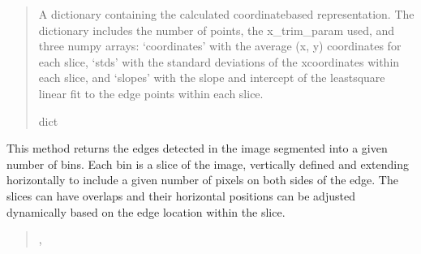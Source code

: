 \documentclass[letterpaper,10pt,english]{sphinxmanual}
\begin{document}
\begin{fulllineitems}
\begin{fulllineitems}
\begin{quote}
\begin{description}
\begin{itemize}
\end{itemize}

\sphinxAtStartPar
A dictionary containing the calculated coordinate\sphinxhyphen{}based representation. The dictionary
includes the number of points, the x\_trim\_param used, and three numpy arrays: ‘coordinates’
with the average (x, y) coordinates for each slice, ‘stds’ with the standard deviations
of the x\sphinxhyphen{}coordinates within each slice, and ‘slopes’ with the slope and intercept of
the least\sphinxhyphen{}square linear fit to the edge points within each slice.

\sphinxAtStartPar
dict

\end{description}\end{quote}

\end{fulllineitems}


\begin{fulllineitems}
\label{\detokenize{forensicfit.core.tape:forensicfit.core.tape.TapeAnalyzer.get_bin_based}}
\pysigstartsignatures
{}
\pysigstopsignatures
\sphinxAtStartPar
This method returns the edges detected in the image segmented into a given number of bins. Each bin is a slice
of the image, vertically defined and extending horizontally to include a given number of pixels on both sides
of the edge. The slices can have overlaps and their horizontal positions can be adjusted dynamically based on
the edge location within the slice.
\begin{quote}\begin{description}
\sphinxAtStartPar
\sphinxcode{\sphinxupquote{List}}{[}\sphinxcode{\sphinxupquote{Tuple}}{[}, \sphinxcode{\sphinxupquote{int}}{]}{]}


\end{description}
\end{quote}
\end{fulllineitems}
\end{fulllineitems}
\end{document}
